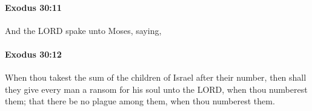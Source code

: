 		\paragraph{Exodus 30:11} %
			\label{EXODUS-30-11}

			And the LORD spake unto Moses, saying,


		\paragraph{Exodus 30:12} %
			\label{EXODUS-30-12}

			When thou takest the sum of the children of Israel after their number, then shall they give every man a ransom for his soul unto the LORD, when thou numberest them; that there be no plague among them, when thou numberest them.


